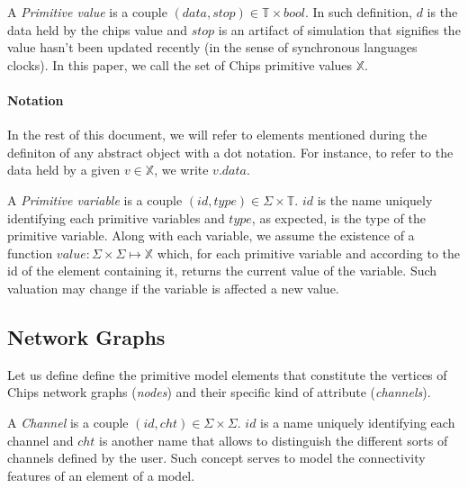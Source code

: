 \documentclass[runningheads]{llncs}
\begin{document}
\begin{definition}\label{def:ChipsPrimitiveType}
    A \emph{Primitive value} is a couple $(data, stop) \in \mathbb{T} \times bool$. In such definition, $d$ is the data held by the chips value and $stop$ is an artifact of simulation that signifies the value hasn't been updated recently (in the sense of synchronous languages clocks). In this paper, we call the set of Chips primitive values $\mathbb{X}$. 
\end{definition}

\paragraph{Notation} In the rest of this document, we will refer to elements mentioned during the definiton of any abstract object with a dot notation. For instance, to refer to the data held by a given $v \in \mathbb{X}$, we write $v.data$.

\begin{definition}\label{def:PrimitiveVariable}
    A \emph{Primitive variable} is a couple $(id,type) \in \Sigma \times \mathbb{T}$. $id$ is the name uniquely identifying each primitive variables and $type$, as expected, is the type of the primitive variable. Along with each variable, we assume the existence of a function $value: \Sigma \times \Sigma \mapsto \mathbb{X}$ which, for each primitive variable and according to the id of the element containing it, returns the current value of the variable. Such valuation may change if the variable is affected a new value.
\end{definition}

\subsection{Network Graphs}
\label{sec:networkgraphs}

Let us define define the primitive model elements that constitute the vertices of Chips network graphs (\emph{nodes}) and their specific kind of attribute (\emph{channels}).

\begin{definition}\label{def:Channel}
    A \emph{Channel} is a couple $(id,cht) \in \Sigma \times \Sigma$. $id$ is a name uniquely identifying each channel and $cht$ is another name that allows to distinguish the different sorts of channels defined by the user. Such concept serves to model the connectivity features of an element of a model.
\end{definition}
\end{document}
